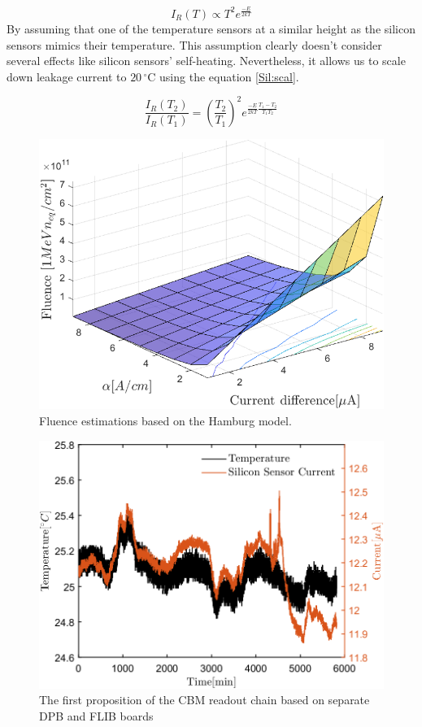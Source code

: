 \begin{equation}
\label{Sil:temp}
    I_{R}(T) \propto T^{2}e^{\frac{-E}{2kT}}
\end{equation}
 By assuming that one of the  temperature sensors at a similar height as the silicon sensors mimics their temperature. This assumption clearly doesn't consider several effects like silicon sensors' self-heating. Nevertheless, it allows us to scale down leakage current to $20\,^{\circ}$C using the equation \ref{Sil:scal}.
 
\begin{equation}
\label{Sil:scal}
    \frac{I_{R}(T_{2})}{I_{R}(T_{1})} = (\frac{T_{2}}{T_{1}})^{2}e^{\frac{-E}{2kT}\frac{T_{1}-T_{2}}{T_{1}T_{2}}}
\end{equation}

\begin{figure}[!h]
\centering
\includegraphics[width=0.65\columnwidth]{Chapter2/images/Leakage_current.png}
\caption{Fluence estimations based on the Hamburg model.}
\label{fig_leakage}
\end{figure}

\begin{figure}[!h]
\centering
\includegraphics[width=0.65\columnwidth]{Chapter2/images/currenttempnobeam.png}
\caption{The first proposition of the CBM readout chain based on separate DPB and FLIB boards \cite{CRI}}
\label{fig_leakage1}
\end{figure}





